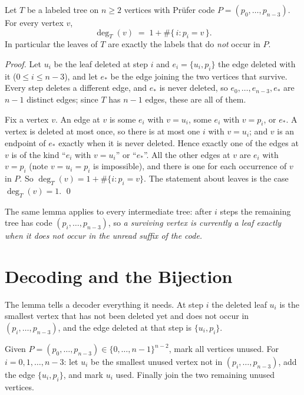 \documentclass[11pt]{article}
\begin{document}
\begin{theorembox}
Let $T$ be a labeled tree on $n\ge2$ vertices with Pr\"ufer code
$P=(p_0,\dots,p_{n-3})$. For every vertex $v$,
\[
  \deg_T(v) \;=\; 1 + \#\{\,i : p_i = v\,\}.
\]
In particular the leaves of $T$ are exactly the labels that do \emph{not}
occur in $P$.

\emph{Proof.} Let $u_i$ be the leaf deleted at step $i$ and
$e_i=\{u_i,p_i\}$ the edge deleted with it ($0\le i\le n-3$), and let
$e_*$ be the edge joining the two vertices that survive. Every step
deletes a different edge, and $e_*$ is never deleted, so $e_0,\dots,e_{n-3},e_*$
are $n-1$ distinct edges; since $T$ has $n-1$ edges, these are all of them.

Fix a vertex $v$. An edge at $v$ is some $e_i$ with $v=u_i$, some $e_i$
with $v=p_i$, or $e_*$. A vertex is deleted at most once, so there is at
most one $i$ with $v=u_i$; and $v$ is an endpoint of $e_*$ exactly when it
is never deleted. Hence exactly one of the edges at $v$ is of the kind
``$e_i$ with $v=u_i$'' or ``$e_*$''. All the other edges at $v$ are
$e_i$ with $v=p_i$ (note $v=u_i=p_i$ is impossible), and there is one for
each occurrence of $v$ in $P$. So $\deg_T(v)=1+\#\{i:p_i=v\}$. The
statement about leaves is the case $\deg_T(v)=1$. \qed
\end{theorembox}

The same lemma applies to every intermediate tree: after $i$ steps the
remaining tree has code $(p_i,\dots,p_{n-3})$, so \emph{a surviving vertex
is currently a leaf exactly when it does not occur in the unread suffix of
the code.}

\section{Decoding and the Bijection}\label{sec:bijection}
The lemma tells a decoder everything it needs. At step $i$ the deleted leaf
$u_i$ is the smallest vertex that has not been deleted yet and does not
occur in $(p_i,\dots,p_{n-3})$, and the edge deleted at that step is
$\{u_i,p_i\}$.

\begin{definitionbox}[Decoding]
Given $P=(p_0,\dots,p_{n-3})\in\{0,\dots,n-1\}^{n-2}$, mark all vertices
unused. For $i=0,1,\dots,n-3$: let $u_i$ be the smallest unused vertex not
in $(p_i,\dots,p_{n-3})$, add the edge $\{u_i,p_i\}$, and mark $u_i$ used.
Finally join the two remaining unused vertices.
\end{definitionbox}
\end{document}
